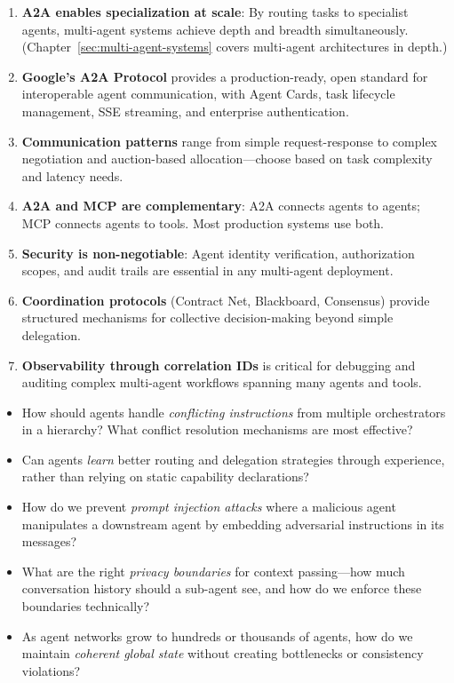 \begin{keybox}
\begin{enumerate}
  \item \textbf{A2A enables specialization at scale}: By routing tasks to specialist agents, multi-agent systems achieve depth and breadth simultaneously. (Chapter~\ref{sec:multi-agent-systems} covers multi-agent architectures in depth.)
  \item \textbf{Google’s A2A Protocol} provides a production-ready, open standard for interoperable agent communication, with Agent Cards, task lifecycle management, SSE streaming, and enterprise authentication.
  \item \textbf{Communication patterns} range from simple request-response to complex negotiation and auction-based allocation---choose based on task complexity and latency needs.
  \item \textbf{A2A and MCP are complementary}: A2A connects agents to agents; MCP connects agents to tools. Most production systems use both.
  \item \textbf{Security is non-negotiable}: Agent identity verification, authorization scopes, and audit trails are essential in any multi-agent deployment.
  \item \textbf{Coordination protocols} (Contract Net, Blackboard, Consensus) provide structured mechanisms for collective decision-making beyond simple delegation.
  \item \textbf{Observability through correlation IDs} is critical for debugging and auditing complex multi-agent workflows spanning many agents and tools.
\end{enumerate}
\end{keybox}

\begin{questionbox}
\begin{itemize}
  \item How should agents handle \emph{conflicting instructions} from multiple orchestrators in a hierarchy? What conflict resolution mechanisms are most effective?
  \item Can agents \emph{learn} better routing and delegation strategies through experience, rather than relying on static capability declarations?
  \item How do we prevent \emph{prompt injection attacks} where a malicious agent manipulates a downstream agent by embedding adversarial instructions in its messages?
  \item What are the right \emph{privacy boundaries} for context passing---how much conversation history should a sub-agent see, and how do we enforce these boundaries technically?
  \item As agent networks grow to hundreds or thousands of agents, how do we maintain \emph{coherent global state} without creating bottlenecks or consistency violations?
\end{itemize}
\end{questionbox}

